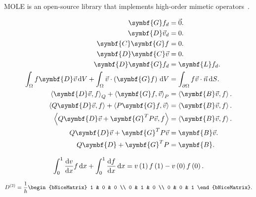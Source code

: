 MOLE is an open-source library that implements high-order mimetic
operators~\cite{Corbino2024}.

\begin{align*}
	\symbf{G}f_{d}                           & =
	\vec{0}.                                     \\
	\symbf{D}\vec{v}_{d}                     & =
	0.                                           \\
	\symbf{C}\symbf{G}f                      & =
	0.                                           \\
	\symbf{D}\symbf{C}\vec{v}                & =
	0.                                           \\
	\symbf{D}\symbf{G}f_{d}                  & =
	\symbf{L}f_{d}.                              \\
	\int_{\Omega}
	f\symbf{D}\vec{v}\dl V+
	\int_{\Omega}
	\vec{v}\cdot\left(\symbf{G}f\right)\dl V & =
	\int_{\partial\Omega}
	f\vec{v}\cdot\vec{n}\dl S.                   \\
	{\left\langle
	\symbf{D}\vec{v},
	f
	\right\rangle}_{Q}+
	{\left\langle
	\symbf{G}f,
	\vec{v}
	\right\rangle}_{P}                       & =
	\left\langle
	\symbf{B}\vec{v},
	f
	\right\rangle.                               \\
	\left\langle
	Q\symbf{D}\vec{v},
	f
	\right\rangle+
	\left\langle
	P\symbf{G}f,
	\vec{v}
	\right\rangle                            & =
	\left\langle
	\symbf{B}\vec{v},
	f
	\right\rangle.                               \\
	\left\langle
	Q\symbf{D}\vec{v}+
	\symbf{G}^{T}P\vec{v},
	f
	\right\rangle                            & =
	\left\langle
	\symbf{B}\vec{v},
	f
	\right\rangle.                               \\
	Q\symbf{D}\vec{v}+
	\symbf{G}^{T}P\vec{v}                    & =
	\symbf{B}\vec{v}.                            \\
	Q\symbf{D}+
	\symbf{G}^{T}P                           & =
	\symbf{B}.
\end{align*}

\begin{equation*}
	\int_{0}^{1}
	\diff{v}{x}f\dl x+
	\int_{0}^{1}
	\diff{f}{x}\dl x=
	v\left(1\right)f\left(1\right)-
	v\left(0\right)f\left(0\right).
\end{equation*}

\begin{equation*}
	D^{\left(2\right)}=
	\frac{1}{h}
	\begin{bNiceMatrix}
		1 & 0 & 0 \\
		0 & 1 & 0 \\
		0 & 0 & 1
	\end{bNiceMatrix}.
\end{equation*}

